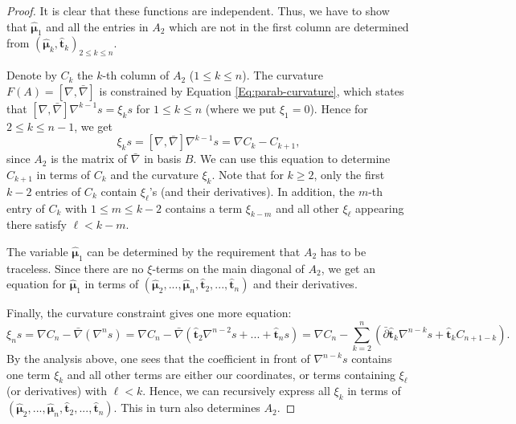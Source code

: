 \documentclass[11pt]{amsart}
\numberwithin{thm}{section} %
\numberwithin{equation}{section} %
\numberwithin{figure}{section} %
\begin{document}
\begin{proof}
It is clear that these functions are independent. Thus, we have to show that $\bm\hat{\mu}_1$ and all the entries in $A_2$ which are not in the first column are determined from $(\bm\hat{\mu}_k,\bm\hat{t}_k)_{2\leq k\leq n}$.

Denote by $C_k$ the $k$-th column of $A_2$ ($1\leq k\leq n$). The curvature $F(A)=[\nabla,\bar\nabla]$ is constrained by Equation \eqref{Eq:parab-curvature}, which states that $[\nabla,\bar\nabla]\nabla^{k-1}s=\xi_k s$ for $1\leq k\leq n$ (where we put $\xi_1=0$). Hence for $2\leq k\leq n-1$, we get
\begin{equation}\label{Eq:xi-k}
\xi_k s = [\nabla,\bar\nabla]\nabla^{k-1}s = \nabla C_k-C_{k+1},
\end{equation}
since $A_2$ is the matrix of $\bar\nabla$ in basis $B$. We can use this equation to determine $C_{k+1}$ in terms of $C_k$ and the curvature $\xi_k$. Note that for $k\geq 2$, only the first $k-2$ entries of $C_k$ contain $\xi_\ell$'s (and their derivatives). In addition, the $m$-th entry of $C_k$ with $1\leq m\leq k-2$ contains a term $\xi_{k-m}$ and all other $\xi_\ell$ appearing there satisfy $\ell<k-m$.

The variable $\bm\hat{\mu}_1$ can be determined by the requirement that $A_2$ has to be traceless. Since there are no $\xi$-terms on the main diagonal of $A_2$, we get an equation for $\bm\hat{\mu}_1$ in terms of
$(\bm\hat{\mu}_2, ..., \bm\hat{\mu}_n, \bm\hat{t}_{2}, ..., \bm\hat{t}_{n})$ and their derivatives.

Finally, the curvature constraint gives one more equation:
\begin{equation}\label{Eq:xi-n}
\xi_n s = \nabla C_n-\bar\nabla(\nabla^n s)  = \nabla C_n-\bar\nabla(\bm\hat{t}_2\nabla^{n-2}s+...+\bm\hat{t}_n s)= \nabla C_n-\sum_{k=2}^n (\bar\partial\bm\hat{t}_k\nabla^{n-k}s+\bm\hat{t}_k C_{n+1-k}).
\end{equation}
By the analysis above, one sees that the coefficient in front of $\nabla^{n-k}s$ contains one term $\xi_k$ and all other terms are either our coordinates, or terms containing $\xi_\ell$ (or derivatives) with $\ell<k$. Hence, we can recursively express all $\xi_k$ in terms of $(\bm\hat{\mu}_2, ..., \bm\hat{\mu}_n, \bm\hat{t}_{2}, ..., \bm\hat{t}_{n})$. This in turn also determines $A_2$.
\end{proof}
\end{document}
